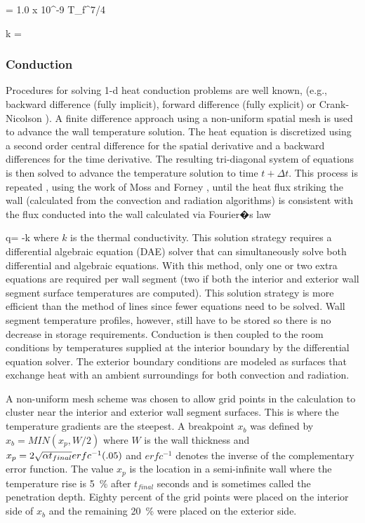 \be \alpha = 1.0 x 10^{-9} T_f^{7/4} \ee

\be k =  \ee

 \subsubsection{Conduction}

 Procedures for solving 1-d heat conduction problems are well known, (e.g., backward difference (fully implicit), forward difference (fully explicit) or Crank-Nicolson \cite{Golub:1989}).  A finite difference approach  using a non-uniform spatial mesh is used to advance the wall temperature solution.  The heat equation is discretized using a second order central difference for the spatial derivative and a backward differences for the time derivative.  The resulting tri-diagonal system of equations is then solved to advance the temperature solution to time $t+\Delta t$.  This process is repeated , using the work of Moss and Forney \cite{Moss:1992},  until  the heat flux striking the wall (calculated from the convection and radiation algorithms) is consistent with the flux conducted into the wall calculated via Fourier�s law

 \be q\dprime = -k  \ee
where $k$ is the thermal conductivity.  This solution strategy requires a differential algebraic equation (DAE) solver that can simultaneously solve both differential and algebraic equations.  With this method, only one or two extra equations are required per wall segment (two if both the interior and exterior wall segment surface temperatures are computed).  This solution strategy is more efficient than the method of lines since fewer equations need to be solved.  Wall segment temperature profiles, however, still have to be stored so there is no decrease in storage requirements.  Conduction is then coupled to the room conditions by temperatures supplied at the interior boundary by the differential equation solver.  The exterior boundary conditions are modeled as surfaces that exchange heat with an ambient surroundings for both convection and radiation.

A non-uniform mesh scheme was chosen to allow grid points in the calculation to cluster near the interior and exterior wall segment surfaces.  This is where the temperature gradients are the steepest.  A breakpoint  $x_b$ was defined by $x_b = MIN(x_p, W/2)$ where $W$ is the wall thickness and $x_p = 2 \sqrt{\alpha t_{final}} erfc^{-1} { \left( {.05} \right) }$ and $erfc^{-1}$ denotes the inverse of the complementary error function.  The value $x_p$ is the location in a semi-infinite wall where the temperature rise is 5~\% after $t_{final}$ seconds and is sometimes called the penetration depth.  Eighty percent of the grid points were placed on the interior side of $x_b$ and the remaining 20~\% were placed on the exterior side.

